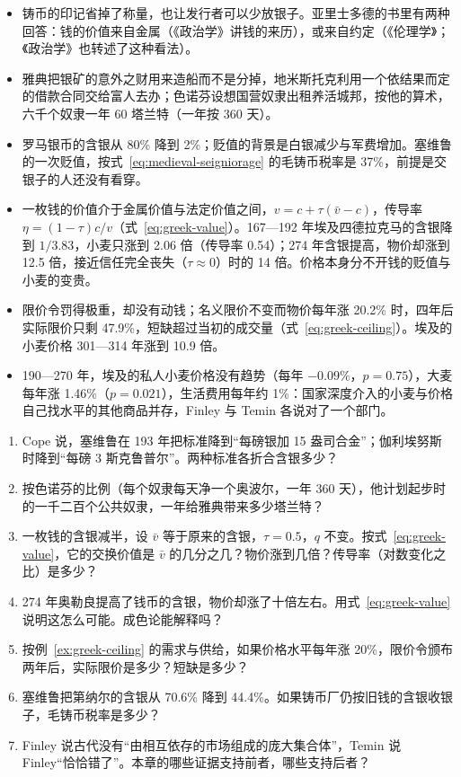 \begin{takeaways}
\begin{itemize}
\item 铸币的印记省掉了称量，也让发行者可以少放银子。亚里士多德的书里有两种回答：钱的价值来自金属（《政治学》讲钱的来历），或来自约定（《伦理学》；《政治学》也转述了这种看法）。
\item 雅典把银矿的意外之财用来造船而不是分掉，地米斯托克利用一个依结果而定的借款合同交给富人去办；色诺芬设想国营奴隶出租养活城邦，按他的算术，六千个奴隶一年 60 塔兰特（一年按 360 天）。
\item 罗马银币的含银从 80\% 降到 2\%；贬值的背景是白银减少与军费增加。塞维鲁的一次贬值，按式~\eqref{eq:medieval-seigniorage} 的毛铸币税率是 37\%，前提是交银子的人还没有看穿。
\item 一枚钱的价值介于金属价值与法定价值之间，$v=c+\tau(\bar v-c)$，传导率 $\eta=(1-\tau)c/v$（式~\eqref{eq:greek-value}）。167—192 年埃及四德拉克马的含银降到 $1/3.83$，小麦只涨到 2.06 倍（传导率 0.54）；274 年含银提高，物价却涨到 12.5 倍，接近信任完全丧失（$\tau\approx0$）时的 14 倍。价格本身分不开钱的贬值与小麦的变贵。
\item 限价令罚得极重，却没有动钱；名义限价不变而物价每年涨 20.2\% 时，四年后实际限价只剩 47.9\%，短缺超过当初的成交量（式~\eqref{eq:greek-ceiling}）。埃及的小麦价格 301—314 年涨到 10.9 倍。
\item 190—270 年，埃及的私人小麦价格没有趋势（每年 $-0.09\%$，$p=0.75$），大麦每年涨 1.46\%（$p=0.021$），生活费用每年约 1\%：国家深度介入的小麦与价格自己找水平的其他商品并存，Finley 与 Temin 各说对了一个部门。
\end{itemize}
\end{takeaways}

\begin{selfcheck}
\begin{enumerate}
\item Cope 说，塞维鲁在 193 年把标准降到“每磅银加 15 盎司合金”；伽利埃努斯时降到“每磅 3 斯克鲁普尔”。两种标准各折合含银多少？
\item 按色诺芬的比例（每个奴隶每天净一个奥波尔，一年 360 天），他计划起步时的一千二百个公共奴隶，一年给雅典带来多少塔兰特？
\item 一枚钱的含银减半，设 $\bar v$ 等于原来的含银，$\tau=0.5$，$q$ 不变。按式~\eqref{eq:greek-value}，它的交换价值是 $\bar v$ 的几分之几？物价涨到几倍？传导率（对数变化之比）是多少？
\item 274 年奥勒良提高了钱币的含银，物价却涨了十倍左右。用式~\eqref{eq:greek-value} 说明这怎么可能。成色论能解释吗？
\item 按例~\ref{ex:greek-ceiling} 的需求与供给，如果价格水平每年涨 20\%，限价令颁布两年后，实际限价是多少？短缺是多少？
\item 塞维鲁把第纳尔的含银从 70.6\% 降到 44.4\%。如果铸币厂仍按旧钱的含银收银子，毛铸币税率是多少？
\item Finley 说古代没有“由相互依存的市场组成的庞大集合体”，Temin 说 Finley“恰恰错了”。本章的哪些证据支持前者，哪些支持后者？
\end{enumerate}
\end{selfcheck}

